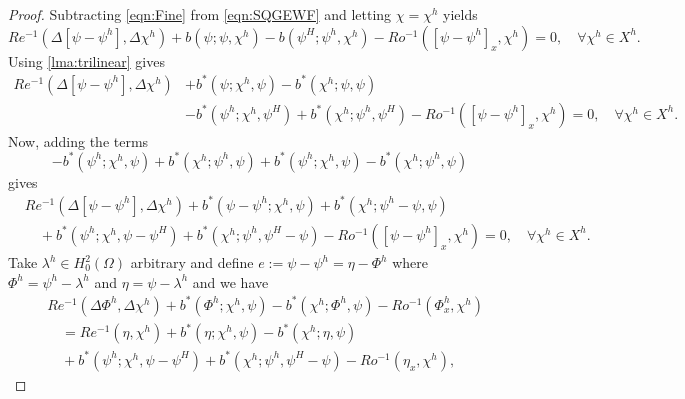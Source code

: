\begin{proof}
  Subtracting \eqref{eqn:Fine} from \eqref{eqn:SQGEWF} and letting $\chi=\chi^h$
  yields
  \begin{equation*}
    Re^{-1} (\Delta \left[\psi - \psi^h\right], \Delta \chi^h) + b(\psi;\psi,\chi^h)
      - b(\psi^H;\psi^h,\chi^h) - Ro^{-1} (\left[\psi-\psi^h\right]_x,\chi^h)
      = 0, \quad \forall \chi^h \in X^h.
  \end{equation*}
  Using \autoref{lma:trilinear} gives
  \begin{equation*}
    \begin{split}
      Re^{-1} (\Delta \left[\psi - \psi^h\right], \Delta \chi^h)
        &+ b^*(\psi;\chi^h, \psi) - b^*(\chi^h;\psi,\psi) \\
      &- b^*(\psi^h;\chi^h,\psi^H) + b^*(\chi^h; \psi^h,\psi^H)
        - Ro^{-1} (\left[\psi-\psi^h\right]_x,\chi^h) = 0,
      \quad \forall \chi^h \in X^h.
    \end{split}
  \end{equation*}
  Now, adding the terms
  \begin{equation*}
    -b^*(\psi^h;\chi^h,\psi) + b^*(\chi^h;\psi^h,\psi) + b^*(\psi^h;\chi^h,\psi) - b^*(\chi^h;\psi^h,\psi)
  \end{equation*}
  gives
  \begin{equation*}
    \begin{split}
      &Re^{-1} (\Delta \left[\psi - \psi^h\right], \Delta \chi^h)
        + b^*(\psi-\psi^h;\chi^h, \psi) + b^*(\chi^h;\psi^h-\psi,\psi) \\
      &\quad+ b^*(\psi^h;\chi^h,\psi-\psi^H) + b^*(\chi^h; \psi^h,\psi^H-\psi)
        - Ro^{-1} (\left[\psi-\psi^h\right]_x,\chi^h) = 0,
    \quad \forall \chi^h \in X^h.
      \end{split}
  \end{equation*}
  Take $\lambda^h\in H^2_0(\Omega)$ arbitrary and define $e:= \psi - \psi^h =
  \eta - \Phi^h$ where $\Phi^h = \psi^h-\lambda^h$ and $\eta=\psi-\lambda^h$ and
  we have
  \begin{equation*}
    \begin{split}
      &Re^{-1}(\Delta \Phi^h, \Delta \chi^h)
        + b^*(\Phi^h;\chi^h, \psi) - b^*(\chi^h;\Phi^h,\psi)
        - Ro^{-1} (\Phi^h_x,\chi^h) \\
      &\quad = Re^{-1} (\eta,\chi^h)
        + b^*(\eta;\chi^h, \psi) - b^*(\chi^h;\eta,\psi) \\
      &\quad+ b^*(\psi^h;\chi^h,\psi-\psi^H) + b^*(\chi^h; \psi^h,\psi^H-\psi)
        - Ro^{-1} (\eta_x,\chi^h),

\end{split}
\end{equation*}
\end{proof}
